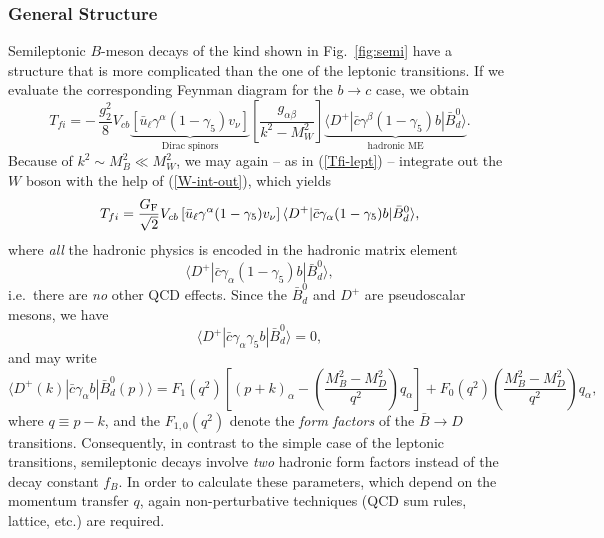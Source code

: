 \documentclass[12pt]{article}
\begin{document}
\subsubsection{General Structure}
%
%
%
Semileptonic $B$-meson decays of the kind shown in Fig.~\ref{fig:semi}
have a structure that is more complicated than the one of the 
leptonic transitions. If we evaluate the corresponding Feynman diagram
for the $b\to c$ case, we obtain
\begin{equation}\label{Tfi-semi-full}
T_{fi}=-\,\frac{g_2^2}{8} V_{cb}
\underbrace{\left[\bar u_\ell\gamma^\alpha(1-\gamma_5)v_\nu
\right]}_{\mbox{Dirac spinors}}
\left[\frac{g_{\alpha\beta}}{k^2-M_W^2}\right]
\underbrace{\langle D^+|\bar c\gamma^\beta
(1-\gamma_5)b|\bar B^0_d\rangle}_{\mbox{hadronic ME}}.
\end{equation}
Because of $k^2\sim M_B^2\ll M_W^2$, we may again -- as in (\ref{Tfi-lept}) --
integrate out the $W$ boson with the help of (\ref{W-int-out}), which
yields
\begin{equation}\label{Tfi-semi}
T_{fi}=\frac{G_{\rm F}}{\sqrt{2}}V_{cb}\left[\bar u_\ell\gamma^\alpha
(1-\gamma_5)v_\nu\right]\langle  D^+|\bar c\gamma_\alpha(1-\gamma_5)b
|\bar B^0_d\rangle,
\end{equation}
where {\it all} the hadronic physics is encoded in the hadronic
matrix element
\begin{displaymath}
\langle D^+|\bar c\gamma_\alpha
(1-\gamma_5)b|\bar B^0_d\rangle,
\end{displaymath}
i.e.\ there are {\it no} other QCD effects.
Since the $\bar B^0_d$ and $D^+$ are pseudoscalar mesons, we have
\begin{equation}
\langle D^+|\bar c\gamma_\alpha\gamma_5b|
\bar B^0_d\rangle=0,
\end{equation}
and may write
\begin{equation}\label{BD-ME}
\langle D^+(k)|\bar c\gamma_\alpha b|\bar B^0_d(p)
\rangle=F_1(q^2)\left[(p+k)_\alpha -
\left(\frac{M_B^2-M_D^2}{q^2}\right)q_\alpha\right]
+F_0(q^2)\left(\frac{M_B^2-M_D^2}{q^2}\right)q_\alpha, 
\end{equation}
where $q\equiv p-k$, and the $F_{1,0}(q^2)$ denote the {\it form factors}
of the $\bar B\to D$ transitions. Consequently, in contrast to the simple 
case of the leptonic transitions, semileptonic decays involve {\it two} 
hadronic form factors instead of the decay constant $f_B$. In order to 
calculate these parameters, which depend on the momentum transfer $q$, 
again non-perturbative techniques (QCD sum rules, lattice,  etc.) are 
required.
\end{document}

